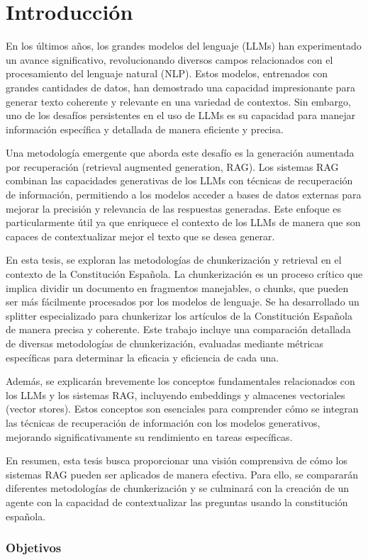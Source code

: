 
\cleardoublepage

\chapter{Introducción}
\label{introduccion}

En los últimos años, los grandes modelos del lenguaje (LLMs) han experimentado un avance significativo, revolucionando diversos campos relacionados con el procesamiento del lenguaje natural (NLP). Estos modelos, entrenados con grandes cantidades de datos, han demostrado una capacidad impresionante para generar texto coherente y relevante en una variedad de contextos. Sin embargo, uno de los desafíos persistentes en el uso de LLMs es su capacidad para manejar información específica y detallada de manera eficiente y precisa.

Una metodología emergente que aborda este desafío es la generación aumentada por recuperación (retrieval augmented generation, RAG). Los sistemas RAG combinan las capacidades generativas de los LLMs con técnicas de recuperación de información, permitiendo a los modelos acceder a bases de datos externas para mejorar la precisión y relevancia de las respuestas generadas. Este enfoque es particularmente útil ya que enriquece el contexto de los LLMs de manera que son capaces de contextualizar mejor el texto que se desea generar.

En esta tesis, se exploran las metodologías de chunkerización y retrieval en el contexto de la Constitución Española. La chunkerización es un proceso crítico que implica dividir un documento en fragmentos manejables, o chunks, que pueden ser más fácilmente procesados por los modelos de lenguaje. Se ha desarrollado un splitter especializado para chunkerizar los artículos de la Constitución Española de manera precisa y coherente. Este trabajo incluye una comparación detallada de diversas metodologías de chunkerización, evaluadas mediante métricas específicas para determinar la eficacia y eficiencia de cada una.

Además, se explicarán brevemente los conceptos fundamentales relacionados con los LLMs y los sistemas RAG, incluyendo embeddings y almacenes vectoriales (vector stores). Estos conceptos son esenciales para comprender cómo se integran las técnicas de recuperación de información con los modelos generativos, mejorando significativamente su rendimiento en tareas específicas.

En resumen, esta tesis busca proporcionar una visión comprensiva de cómo los sistemas RAG pueden ser aplicados de manera efectiva. Para ello, se compararán diferentes metodologías de chunkerización y se culminará con la creación de un agente con la capacidad de contextualizar las preguntas usando la constitución española.

\subsection{Objetivos}
